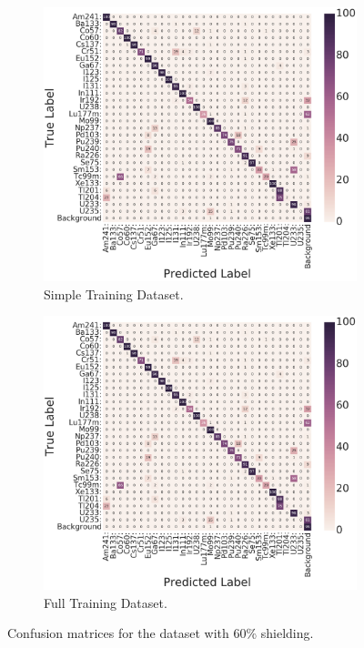 \begin{figure}[H]
     \centering
     \begin{subfigure}[b]{0.8\textwidth}
         \centering
         \includegraphics[width=\textwidth]{model_choice_hyperparameter_search_images/conf_matrix_example.png}
         \caption{Simple Training Dataset.}
         \label{fig:results_easy_distance_comparison_simple}
     \end{subfigure}

     \begin{subfigure}[b]{0.8\textwidth}
         \centering
         \includegraphics[width=\textwidth]{model_choice_hyperparameter_search_images/conf_matrix_example.png}
         \caption{Full Training Dataset.}
         \label{fig:results_easy_distance_comparison_full}
     \end{subfigure}
        \caption{Confusion matrices for the dataset with 60\% shielding.}
        \label{fig:results_easy_distance_comparison}
\end{figure}


